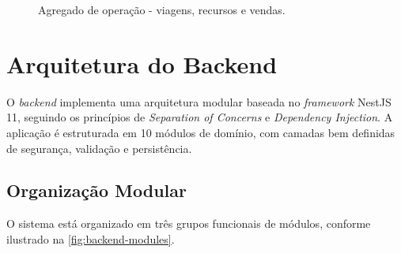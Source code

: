 \begin{figure}[H]
  \caption{Agregado de operação - viagens, recursos e vendas.}
\end{figure}

\section{Arquitetura do Backend}

O \textit{backend} implementa uma arquitetura modular baseada no \textit{framework} NestJS 11, seguindo os princípios de \textit{Separation of Concerns} e \textit{Dependency Injection}. A aplicação é estruturada em 10 módulos de domínio, com camadas bem definidas de segurança, validação e persistência.

\subsection{Organização Modular}

O sistema está organizado em três grupos funcionais de módulos, conforme ilustrado na \autoref{fig:backend-modules}.

